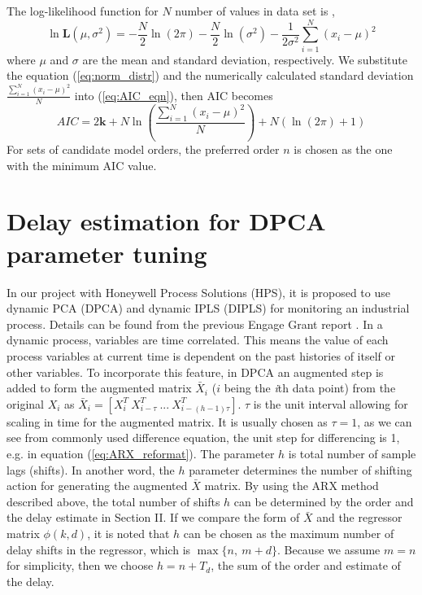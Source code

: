 \documentclass[letterpaper, 12 pt, Journal, onecolumn]{ieeeconf}  %
\begin{document}
The log-likelihood function for $N$ number of values in data set is \cite{AIC},
	\begin{equation} \label{eq:norm_distr}
	\ln \mathbf{L}(\mu,\sigma^2) = -\frac{N}{2}\ln(2\pi)-\frac{N}{2}\ln(\sigma^2)-\frac{1}{2\sigma^2}\sum_{i=1}^{N} (x_i-\mu)^2	
	\end{equation}
where $\mu$ and $\sigma$ are the mean and standard deviation, respectively.
We substitute the equation (\ref{eq:norm_distr}) and the numerically calculated standard deviation $\displaystyle{\frac{\sum_{i=1}^{N} (x_i-\mu)^2}{N}}$ into (\ref{eq:AIC_eqn}), then AIC becomes
	\begin{equation}
	AIC = 2\mathbf{k} + N \ln(\frac{\sum_{i=1}^{N} (x_i-\mu)^2}{N}) + N(\ln(2\pi)+1) 
	\end{equation}
For sets of candidate model orders, the preferred order $n$ is chosen as the one with the minimum AIC value.

\section{Delay estimation for DPCA parameter tuning}

In our project with Honeywell Process Solutions (HPS), it is proposed to use dynamic PCA (DPCA) and dynamic IPLS (DIPLS) for monitoring an industrial process. Details can be found from the previous Engage Grant report \cite{EGreport}. In a dynamic process, variables are time correlated. This means the value of each process variables at current time is dependent on the past histories of itself or other variables. To incorporate this feature, in DPCA an augmented step is added to form the augmented matrix $\bar{X}_i$ ($i$ being the \textit{i}th data point) from the original $X_i$ as $\bar{X}_{i}=[X_{i}^{T} \ X_{i-\tau}^{T}\ ... \ X_{i-(h-1)\tau}^{T} ]$. $\tau$ is the unit interval allowing for scaling in time for the augmented matrix. It is usually chosen as $\tau=1$, as we can see from commonly used difference equation, the unit step for differencing is 1, e.g. in equation (\ref{eq:ARX_reformat}). The parameter $h$ is total number of sample lags (shifts). In another word, the $h$ parameter determines the number of shifting action for generating the augmented $\bar{X}$ matrix. By using the ARX method described above, the total number of shifts $h$ can be determined by the order and the delay estimate in Section II. If we compare the form of $\bar{X}$ and the regressor matrix $\phi(k,d)$, it is noted that $h$ can be chosen as the maximum number of delay shifts in the regressor, which is $\max \{n,~m+d\}$. Because we assume $m=n$ for simplicity, then we choose $h=n+T_d$, the sum of the order and estimate of the delay.
\end{document}

